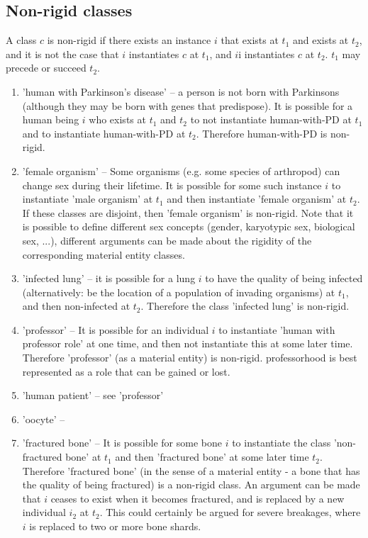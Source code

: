 \documentclass{bioinfo}
\begin{document}
\subsection{Non-rigid classes}

A class $c$ is non-rigid if there exists an instance $i$ that exists
at $t_1$ and exists at $t_2$, and it is not the case that $i$
instantiates $c$ at $t_1$, and $i$i instantiates $c$ at $t_2$. $t_1$
may precede or succeed $t_2$.

\begin{enumerate}

\item 'human with Parkinson's disease' -- a person is not born with
  Parkinsons (although they may be born with genes that
  predispose). It is possible for a human being $i$ who exists at
  $t_1$ and $t_2$ to not instantiate human-with-PD at $t_1$ and to
  instantiate human-with-PD at $t_2$. Therefore human-with-PD is
  non-rigid.

\item 'female organism' -- Some organisms (e.g. some species of
  arthropod) can change sex during their lifetime. It is possible for
  some such instance $i$ to instantiate 'male organism' at $t_1$ and
  then instantiate 'female organism' at $t_2$. If these classes are
  disjoint, then 'female organism' is non-rigid. Note that it is
  possible to define different sex concepts (gender, karyotypic sex,
  biological sex, ...), different arguments can be made about the
  rigidity of the corresponding material entity classes.

\item 'infected lung' -- it is possible for a lung $i$ to have the
  quality of being infected (alternatively: be the location of a
  population of invading organisms) at $t_1$, and then non-infected at
  $t_2$. Therefore the class 'infected lung' is non-rigid.

\item 'professor' -- It is possible for an individual $i$ to
  instantiate 'human with professor role' at one time, and then not
  instantiate this at some later time. Therefore 'professor' (as a
  material entity) is non-rigid. professorhood is best represented as
  a role that can be gained or lost.

  \item 'human patient' -- see 'professor'

  \item 'oocyte' -- 

  \item 'fractured bone' -- It is possible for some bone $i$ to
    instantiate the class 'non-fractured bone' at $t_1$ and then
    'fractured bone' at some later time $t_2$. Therefore 'fractured
    bone' (in the sense of a material entity - a bone that has the
    quality of being fractured) is a non-rigid class. An argument can
    be made that $i$ ceases to exist when it becomes fractured, and is
    replaced by a new individual $i_2$ at $t_2$. This could certainly
    be argued for severe breakages, where $i$ is replaced to two or
    more bone shards.


\end{enumerate}
\end{document}
